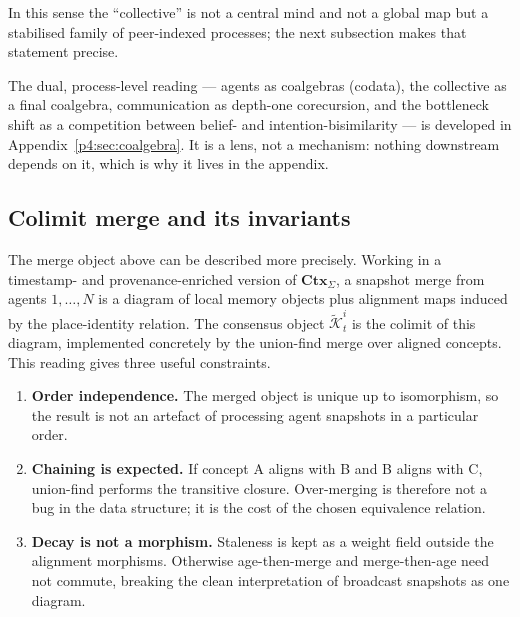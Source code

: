 \documentclass{article}
\begin{document}
In this sense the ``collective'' is not a central mind and not a global
map but a stabilised family of peer-indexed processes; the next
subsection makes that statement precise.

The dual, process-level reading --- agents as coalgebras (codata), the
collective as a final coalgebra, communication as depth-one
corecursion, and the bottleneck shift as a competition between belief-
and intention-bisimilarity --- is developed in
Appendix~\ref{p4:sec:coalgebra}. It is a lens, not a mechanism: nothing
downstream depends on it, which is why it lives in the appendix.

\subsection{Colimit merge and its invariants}
\label{p4:sec:colimit}

The merge object above can be described more precisely. Working in a
timestamp- and provenance-enriched version of $\mathbf{Ctx}_\Sigma$, a
snapshot merge from agents $1,\dots,N$ is a diagram of local memory
objects plus alignment maps induced by the place-identity relation. The
consensus object $\widetilde{\mathcal{K}}_t^i$ is the colimit of this
diagram, implemented concretely by the union-find merge over aligned
concepts. This reading gives three useful constraints.
\begin{enumerate}[leftmargin=20pt,itemsep=2pt,topsep=2pt]
\item \textbf{Order independence.} The merged object is unique up to isomorphism, so the result is not an artefact of processing agent snapshots in a particular order.
\item \textbf{Chaining is expected.} If concept A aligns with B and B aligns with C, union-find performs the transitive closure. Over-merging is therefore not a bug in the data structure; it is the cost of the chosen equivalence relation.
\item \textbf{Decay is not a morphism.} Staleness is kept as a weight field outside the alignment morphisms. Otherwise age-then-merge and merge-then-age need not commute, breaking the clean interpretation of broadcast snapshots as one diagram.
\end{enumerate}
\end{document}
